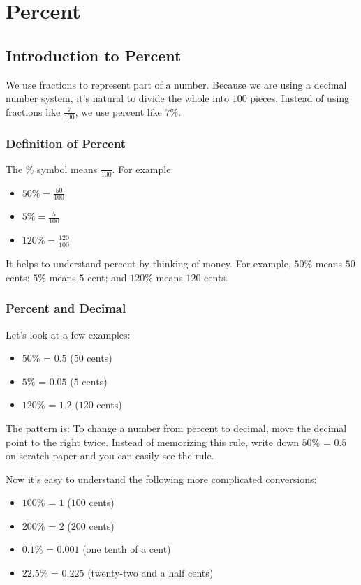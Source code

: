 

\chapter{Percent}
\section{Introduction to Percent}
\thispagestyle{fancy}

We use fractions to represent part of a number. Because we are using a decimal number system, it's natural to divide the whole into $100$ pieces. Instead of using fractions like $\frac{7}{100}$, we use percent like $7\%$.

\subsection{Definition of Percent}
The $\%$ symbol means $\frac{}{100}$. For example:
\begin{itemize}
\item $50\%=\frac{50}{100}$
\item $5\%=\frac{5}{100}$
\item $120\%=\frac{120}{100}$
\end{itemize}

It helps to understand percent by thinking of money. For example, $50\%$ means $50$ cents; $5\%$ means $5$ cent; and $120\%$ means $120$ cents.

\subsection{Percent and Decimal}
Let's look at a few examples:
\begin{itemize}
\item $50\%$ = $0.5$ ($50$ cents)
\item $5\%$ = $0.05$ ($5$ cents)
\item $120\%$ = $1.2$ ($120$ cents)
\end{itemize}

The pattern is: To change a number from percent to decimal, move the decimal point to the right twice. Instead of memorizing this rule, write down $50\%$ = $0.5$ on scratch paper and you can easily see the rule.

Now it's easy to understand the following more complicated conversions:
\begin{itemize}
\item $100\%$ = $1$ ($100$ cents)
\item $200\%$ = $2$ ($200$ cents)
\item $0.1\%$ = $0.001$ (one tenth of a cent)
\item $22.5\%$ = $0.225$ (twenty-two and a half cents)
\end{itemize}


